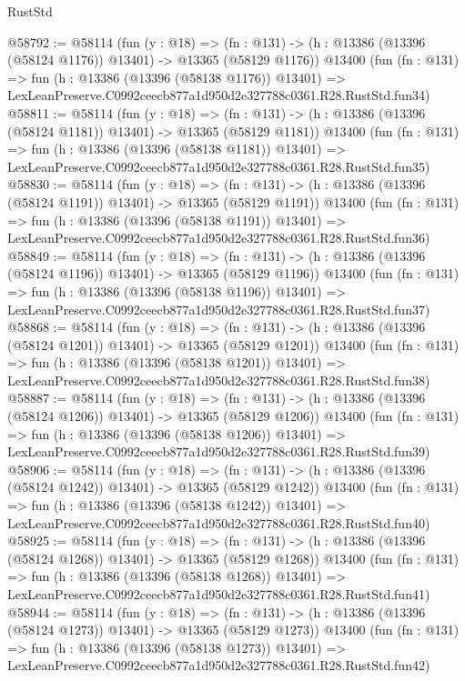 \begin{lexlean}{RustStd}
\begin{coremodule}
@58792 := @58114
    (fun (y : @18) =>
    (fn : @131) -> (h : @13386 (@13396 (@58124 @1176)) @13401) -> @13365 (@58129 @1176))
    @13400
    (fun (fn : @131) =>
    fun (h : @13386 (@13396 (@58138 @1176)) @13401) =>
    LexLeanPreserve.C0992ceecb877a1d950d2e327788c0361.R28.RustStd.fun34)
@58811 := @58114
    (fun (y : @18) =>
    (fn : @131) -> (h : @13386 (@13396 (@58124 @1181)) @13401) -> @13365 (@58129 @1181))
    @13400
    (fun (fn : @131) =>
    fun (h : @13386 (@13396 (@58138 @1181)) @13401) =>
    LexLeanPreserve.C0992ceecb877a1d950d2e327788c0361.R28.RustStd.fun35)
@58830 := @58114
    (fun (y : @18) =>
    (fn : @131) -> (h : @13386 (@13396 (@58124 @1191)) @13401) -> @13365 (@58129 @1191))
    @13400
    (fun (fn : @131) =>
    fun (h : @13386 (@13396 (@58138 @1191)) @13401) =>
    LexLeanPreserve.C0992ceecb877a1d950d2e327788c0361.R28.RustStd.fun36)
@58849 := @58114
    (fun (y : @18) =>
    (fn : @131) -> (h : @13386 (@13396 (@58124 @1196)) @13401) -> @13365 (@58129 @1196))
    @13400
    (fun (fn : @131) =>
    fun (h : @13386 (@13396 (@58138 @1196)) @13401) =>
    LexLeanPreserve.C0992ceecb877a1d950d2e327788c0361.R28.RustStd.fun37)
@58868 := @58114
    (fun (y : @18) =>
    (fn : @131) -> (h : @13386 (@13396 (@58124 @1201)) @13401) -> @13365 (@58129 @1201))
    @13400
    (fun (fn : @131) =>
    fun (h : @13386 (@13396 (@58138 @1201)) @13401) =>
    LexLeanPreserve.C0992ceecb877a1d950d2e327788c0361.R28.RustStd.fun38)
@58887 := @58114
    (fun (y : @18) =>
    (fn : @131) -> (h : @13386 (@13396 (@58124 @1206)) @13401) -> @13365 (@58129 @1206))
    @13400
    (fun (fn : @131) =>
    fun (h : @13386 (@13396 (@58138 @1206)) @13401) =>
    LexLeanPreserve.C0992ceecb877a1d950d2e327788c0361.R28.RustStd.fun39)
@58906 := @58114
    (fun (y : @18) =>
    (fn : @131) -> (h : @13386 (@13396 (@58124 @1242)) @13401) -> @13365 (@58129 @1242))
    @13400
    (fun (fn : @131) =>
    fun (h : @13386 (@13396 (@58138 @1242)) @13401) =>
    LexLeanPreserve.C0992ceecb877a1d950d2e327788c0361.R28.RustStd.fun40)
@58925 := @58114
    (fun (y : @18) =>
    (fn : @131) -> (h : @13386 (@13396 (@58124 @1268)) @13401) -> @13365 (@58129 @1268))
    @13400
    (fun (fn : @131) =>
    fun (h : @13386 (@13396 (@58138 @1268)) @13401) =>
    LexLeanPreserve.C0992ceecb877a1d950d2e327788c0361.R28.RustStd.fun41)
@58944 := @58114
    (fun (y : @18) =>
    (fn : @131) -> (h : @13386 (@13396 (@58124 @1273)) @13401) -> @13365 (@58129 @1273))
    @13400
    (fun (fn : @131) =>
    fun (h : @13386 (@13396 (@58138 @1273)) @13401) =>
    LexLeanPreserve.C0992ceecb877a1d950d2e327788c0361.R28.RustStd.fun42)

\end{coremodule}
\end{lexlean}
